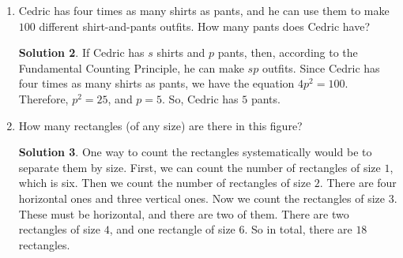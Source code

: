 \documentclass{article}
\theoremstyle{definition}
\newtheorem*{solution}{Solution}
\begin{document}
\begin{enumerate}
\begin{solution}
            We can solve this problem in a differnet way if we say that the 
            order doesn't matter. There are $7$ ways to choose the first person 
            and $6$ ways to choose the second person, but we are counting each 
            pair twice since they can be in one of two orders, so we divide by 
            two to get $\frac{7 \cdot 6}{2} = 21$ ways of choosing two people 
            out of seven where order doesn't matter. There are $3$ ways to 
            choose a boy and $4$ ways to choose a girl, so there are a total of 
            $12$ ways to choose a boy and a girl. And the probability is 
            $\frac{12}{21} = \frac{4}{7}$.
        \end{solution}
    \item Cedric has four times as many shirts as pants, and he can use them to 
        make $100$ different shirt-and-pants outfits. How many pants does Cedric 
        have?
        \begin{solution}
            If Cedric has $s$ shirts and $p$ pants, then, according to the 
            Fundamental Counting Principle, he can make $sp$ outfits. Since 
            Cedric has four times as many shirts as pants, we have the equation 
            $4p^2 = 100$. Therefore, $p^2 = 25$, and $p = 5$. So, Cedric has $5$ 
            pants.
        \end{solution}
    \item How many rectangles (of any size) are there in this figure?
        \begin{center}
        \end{center}
        \begin{solution}
            One way to count the rectangles systematically would be to separate 
            them by size. First, we can count the number of rectangles of size 
            $1$, which is six. Then we count the number of rectangles of size 
            $2$. There are four horizontal ones and three vertical ones. Now we 
            count the rectangles of size $3$. These must be horizontal, and 
            there are two of them. There are two rectangles of size $4$, and one 
            rectangle of size $6$. So in total, there are $18$ rectangles.


\end{solution}
\end{enumerate}
\end{document}
